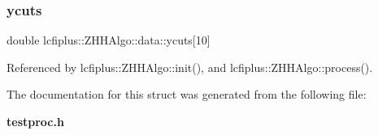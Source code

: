 \subsubsection{ycuts}
{\footnotesize\ttfamily double lcfiplus\+::\+Z\+H\+H\+Algo\+::data\+::ycuts[10]}



Referenced by lcfiplus\+::\+Z\+H\+H\+Algo\+::init(), and lcfiplus\+::\+Z\+H\+H\+Algo\+::process().



The documentation for this struct was generated from the following file\+:\begin{DoxyCompactItemize}
\item 
\textbf{ testproc.\+h}\end{DoxyCompactItemize}
